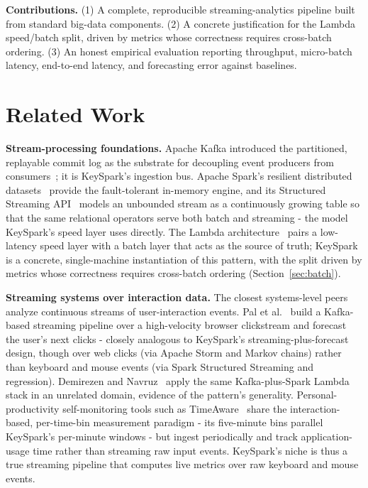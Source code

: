 \documentclass[conference]{IEEEtran}
\begin{document}
\textbf{Contributions.} (1) A complete, reproducible streaming-analytics
pipeline built from standard big-data components. (2) A concrete
justification for the Lambda speed/batch split, driven by metrics whose
correctness requires cross-batch ordering. (3) An honest empirical
evaluation reporting throughput, micro-batch latency, end-to-end latency,
and forecasting error against baselines.

\section{Related Work}
\label{sec:related}

\textbf{Stream-processing foundations.} Apache Kafka introduced the
partitioned, replayable commit log as the substrate for decoupling event
producers from consumers~\cite{kreps2011kafka}; it is KeySpark's
ingestion bus. Apache Spark's resilient distributed
datasets~\cite{zaharia2012rdd} provide the fault-tolerant in-memory
engine, and its Structured Streaming API~\cite{armbrust2018structured}
models an unbounded stream as a continuously growing table so that the
same relational operators serve both batch and streaming - the model
KeySpark's speed layer uses directly. The Lambda
architecture~\cite{marz2015bigdata} pairs a low-latency speed layer with
a batch layer that acts as the source of truth; KeySpark is a
concrete, single-machine instantiation of this pattern, with the split
driven by metrics whose correctness requires cross-batch ordering
(Section~\ref{sec:batch}).

\textbf{Streaming systems over interaction data.} The closest
systems-level peers analyze continuous streams of user-interaction
events. Pal et al.~\cite{pal2023clickstream} build a Kafka-based
streaming pipeline over a high-velocity browser clickstream and forecast
the user's next clicks - closely analogous to KeySpark's
streaming-plus-forecast design, though over web clicks (via Apache Storm
and Markov chains) rather than keyboard and mouse events (via Spark
Structured Streaming and regression). Demirezen and
Navruz~\cite{demirezen2023lambda} apply the same Kafka-plus-Spark Lambda
stack in an unrelated domain, evidence of the pattern's generality.
Personal-productivity self-monitoring tools such as
TimeAware~\cite{kim2016timeaware} share the interaction-based,
per-time-bin measurement paradigm - its five-minute bins parallel
KeySpark's per-minute windows - but ingest periodically and track
application-usage time rather than streaming raw input events.
KeySpark's niche is thus a true streaming pipeline that computes live
metrics over raw keyboard and mouse events.
\end{document}
